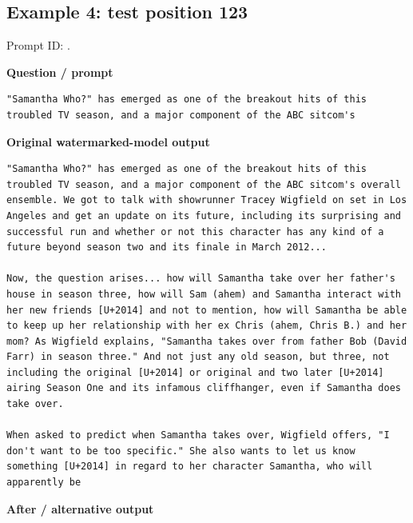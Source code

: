 \subsection{Example 4: test position
123}\label{record-docs-watermarking-qualitative-paper-sir-bira-md-example-4-test-position-123}

Prompt ID:
\texttt{}.

\textbf{Question / prompt}

\begin{Verbatim}
"Samantha Who?" has emerged as one of the breakout hits of this troubled TV season, and a major component of the ABC sitcom's
\end{Verbatim}

\textbf{Original watermarked-model output}

\begin{Verbatim}
"Samantha Who?" has emerged as one of the breakout hits of this troubled TV season, and a major component of the ABC sitcom's overall ensemble. We got to talk with showrunner Tracey Wigfield on set in Los Angeles and get an update on its future, including its surprising and successful run and whether or not this character has any kind of a future beyond season two and its finale in March 2012...

Now, the question arises... how will Samantha take over her father's house in season three, how will Sam (ahem) and Samantha interact with her new friends [U+2014] and not to mention, how will Samantha be able to keep up her relationship with her ex Chris (ahem, Chris B.) and her mom? As Wigfield explains, "Samantha takes over from father Bob (David Farr) in season three." And not just any old season, but three, not including the original [U+2014] or original and two later [U+2014] airing Season One and its infamous cliffhanger, even if Samantha does take over.

When asked to predict when Samantha takes over, Wigfield offers, "I don't want to be too specific." She also wants to let us know something [U+2014] in regard to her character Samantha, who will apparently be
\end{Verbatim}

\textbf{After / alternative output}

